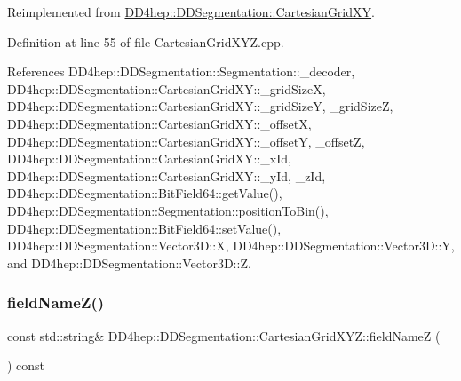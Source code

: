 Reimplemented from \hyperlink{class_d_d4hep_1_1_d_d_segmentation_1_1_cartesian_grid_x_y_a06e75589ebca4af45178854dc341b9c0}{D\+D4hep\+::\+D\+D\+Segmentation\+::\+Cartesian\+Grid\+XY}.



Definition at line 55 of file Cartesian\+Grid\+X\+Y\+Z.\+cpp.



References D\+D4hep\+::\+D\+D\+Segmentation\+::\+Segmentation\+::\+\_\+decoder, D\+D4hep\+::\+D\+D\+Segmentation\+::\+Cartesian\+Grid\+X\+Y\+::\+\_\+grid\+SizeX, D\+D4hep\+::\+D\+D\+Segmentation\+::\+Cartesian\+Grid\+X\+Y\+::\+\_\+grid\+SizeY, \+\_\+grid\+SizeZ, D\+D4hep\+::\+D\+D\+Segmentation\+::\+Cartesian\+Grid\+X\+Y\+::\+\_\+offsetX, D\+D4hep\+::\+D\+D\+Segmentation\+::\+Cartesian\+Grid\+X\+Y\+::\+\_\+offsetY, \+\_\+offsetZ, D\+D4hep\+::\+D\+D\+Segmentation\+::\+Cartesian\+Grid\+X\+Y\+::\+\_\+x\+Id, D\+D4hep\+::\+D\+D\+Segmentation\+::\+Cartesian\+Grid\+X\+Y\+::\+\_\+y\+Id, \+\_\+z\+Id, D\+D4hep\+::\+D\+D\+Segmentation\+::\+Bit\+Field64\+::get\+Value(), D\+D4hep\+::\+D\+D\+Segmentation\+::\+Segmentation\+::position\+To\+Bin(), D\+D4hep\+::\+D\+D\+Segmentation\+::\+Bit\+Field64\+::set\+Value(), D\+D4hep\+::\+D\+D\+Segmentation\+::\+Vector3\+D\+::X, D\+D4hep\+::\+D\+D\+Segmentation\+::\+Vector3\+D\+::Y, and D\+D4hep\+::\+D\+D\+Segmentation\+::\+Vector3\+D\+::Z.

\hypertarget{class_d_d4hep_1_1_d_d_segmentation_1_1_cartesian_grid_x_y_z_a1c8ad1c7a2b4b3da247b78dde6a3fa18}{}\label{class_d_d4hep_1_1_d_d_segmentation_1_1_cartesian_grid_x_y_z_a1c8ad1c7a2b4b3da247b78dde6a3fa18} 
\subsubsection{\texorpdfstring{field\+Name\+Z()}{fieldNameZ()}}
{\footnotesize\ttfamily const std\+::string\& D\+D4hep\+::\+D\+D\+Segmentation\+::\+Cartesian\+Grid\+X\+Y\+Z\+::field\+NameZ (\begin{DoxyParamCaption}{ }\end{DoxyParamCaption}) const\hspace{0.3cm}{\ttfamily [inline]}}



